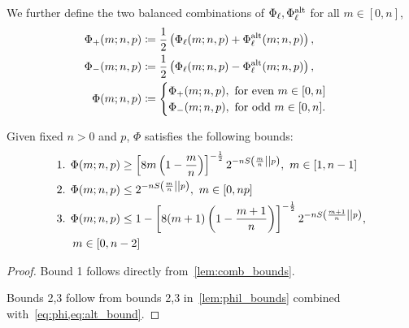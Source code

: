 \documentclass[pra,
aps,
twocolumn,
superscriptaddress,
groupedaddress,
nofootinbib,
reprint
]{revtex4-1}
\begin{document}
We further define the two balanced combinations of $\Phi_\ell, \Phi_\ell^{\rm{alt}}$ for all $m\in [0,n]$,
\begin{align}	
	\Phi_+(m; n, p) &\coloneqq \frac{1}{2} \left( \Phi_\ell(m; n, p) + \Phi_\ell^{\rm{alt}}(m; n, p) \right), \\
	\Phi_-(m; n, p) &\coloneqq \frac{1}{2} \left( \Phi_\ell(m; n, p) - \Phi_\ell^{\rm{alt}}(m; n, p) \right), \\
	\Phi(m; n, p) &\coloneqq \label{eq:phi}
	\begin{cases}
		\Phi_+(m; n, p),\ \text{for even }m\in[0,n] \\
		\Phi_-(m; n, p),\ \text{for odd }m\in[0,n].
	\end{cases}
\end{align}
\begin{lemma}\label{lem:phi_bounds}
	Given fixed $n>0$ and $p$, $\Phi$ satisfies the following bounds:
	\begin{align*}
		\begin{split}
		&\text{1. } \Phi(m; n, p) \geq \left[ 8m\left(1-\frac{m}{n}\right) \right]^{-\frac{1}{2}} 2^{-n{S\left( \frac{m}{n} \middle\vert\middle\vert p \right)}},\ m\in [1,n-1] \\
		&\text{2. } \Phi(m; n, p) \leq 2^{-n{S\left( \frac{m}{n} \middle\vert\middle\vert p \right)}},\ m\in [0,np] \\
		&\text{3. } \Phi(m; n, p) \leq 1 - \left[ 8(m+1)\left(1-\frac{m+1}{n}\right) \right]^{-\frac{1}{2}} 2^{-nS\left( \frac{m+1}{n} \middle\vert\middle\vert p \right)}, \\
		&\hspace{14pt} m\in [0,n-2]
		\end{split}
	\end{align*}
\end{lemma}
\begin{proof}
	Bound 1 follows directly from~\cref{lem:comb_bounds}.
	
	Bounds 2,3 follow from bounds 2,3 in~\cref{lem:phil_bounds} combined with~\cref{eq:phi,eq:alt_bound}.
\end{proof}
\end{document}

